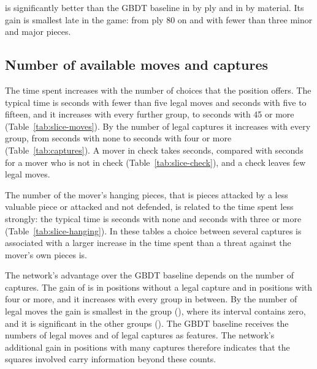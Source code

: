 \documentclass[11pt]{article}
\begin{document}
 is significantly better than the GBDT baseline in
 by ply and in  by material.
Its gain is smallest late in the game:  from ply 80 on
and  with fewer than three minor and major pieces.

\subsection{Number of available moves and captures}

The time spent increases with the number of choices that the position
offers. The typical time is 
seconds with fewer than five legal moves and 
seconds with five to fifteen, and it increases with every further group, to
 seconds with 45 or more
(Table~\ref{tab:slice-moves}). By the number of legal captures it increases
with every group, from  seconds with none to
 seconds with four or more
(Table~\ref{tab:captures}). A mover in check takes
 seconds, compared with
 seconds for a mover who is not in check
(Table~\ref{tab:slice-check}), and a check leaves few legal moves.

\begin{table}[htbp]\centering\footnotesize
{}
\caption{Test-set results by the number of legal captures.}
\label{tab:captures}
\end{table}

The number of the mover's hanging pieces, that is pieces attacked by a less
valuable piece or attacked and not defended, is related to the time spent
less strongly: the typical time is  seconds with
none and  seconds with three or more
(Table~\ref{tab:slice-hanging}). In these tables a choice between several
captures is associated with a larger increase in the time spent than a threat
against the mover's own pieces is.

The network's advantage over the GBDT baseline depends on the number of
captures. The gain of  is  in
positions without a legal capture and  in positions
with four or more, and it increases with every group in between. By the
number of legal moves the gain is smallest in the group
 (), where its
interval contains zero, and it is significant in the other groups
(). The GBDT baseline receives the numbers of
legal moves and of legal captures as features. The network's additional gain
in positions with many captures therefore indicates that the squares
involved carry information beyond these counts.
\end{document}
